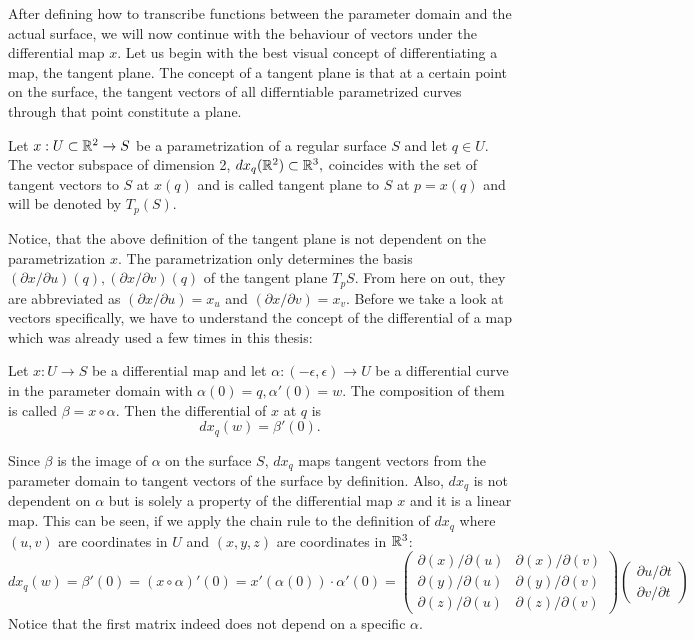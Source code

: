 After defining how to transcribe functions between the parameter domain and the actual surface, we will now continue with the behaviour of vectors under the differential map $x$.
Let us begin with the best visual concept of differentiating a map, the tangent plane.
The concept of a tangent plane is that at a certain point on the surface, the tangent vectors of all differntiable parametrized curves through that point constitute a plane.
\begin{mydef}
	Let $x: U  \subset \mathbb{R}^2 \rightarrow S$ be a parametrization of a regular surface $S$ and let $q \in U$.
	The vector subspace of dimension 2, $dx_q(\mathbb{R}^2) \subset \mathbb{R}^3,$ coincides with the set of tangent vectors to $S$ at $x(q)$ and is called tangent plane to $S$ at $p = x(q)$ and will be denoted by $T_p(S)$.
\end{mydef}
Notice, that the above definition of the tangent plane is not dependent on the parametrization $x$.
The parametrization only determines the basis ${(\partial x/\partial u)(q), (\partial x/\partial v)(q)}$ of the tangent plane $T_pS$.
From here on out, they are abbreviated as $(\partial x/\partial u) = x_u$ and $(\partial x/\partial v) = x_v$.
Before we take a look at vectors specifically, we have to understand the concept of the differential of a map which was already used a few times in this thesis:
\begin{mydef}
	Let $x: U \rightarrow S$ be a differential map and let $\alpha: (-\epsilon, \epsilon) \rightarrow U$ be a differential curve in the parameter domain with $\alpha(0) = q, \alpha'(0) = w$.
	The composition of them is called $\beta = x \circ \alpha$.
	Then the differential of $x$ at $q$ is
	$$dx_q(w) = \beta'(0).$$
\end{mydef}
Since $\beta$ is the image of $\alpha$ on the surface $S$, $dx_q$ maps tangent vectors from the parameter domain to tangent vectors of the surface by definition.
Also, $dx_q$ is not dependent on $\alpha$ but is solely a property of the differential map $x$ and it is a linear map.
This can be seen, if we apply the chain rule to the definition of $dx_q$ where $(u,v)$ are coordinates in $U$ and $(x,y,z)$ are coordinates in $\mathbb{R}^3$:
$$dx_q(w) = \beta'(0) = (x \circ \alpha)'(0) = x'(\alpha(0)) \cdot \alpha'(0) = \begin{pmatrix} \partial(x)/\partial(u) & \partial(x)/\partial(v) \\
																								\partial(y)/\partial(u) & \partial(y)/\partial(v) \\
																								\partial(z)/\partial(u) & \partial(z)/\partial(v)
																				\end{pmatrix}
	\begin{pmatrix} \partial u/\partial t \\ \partial v /\partial t \end{pmatrix} $$
Notice that the first matrix indeed does not depend on a specific $\alpha$.

